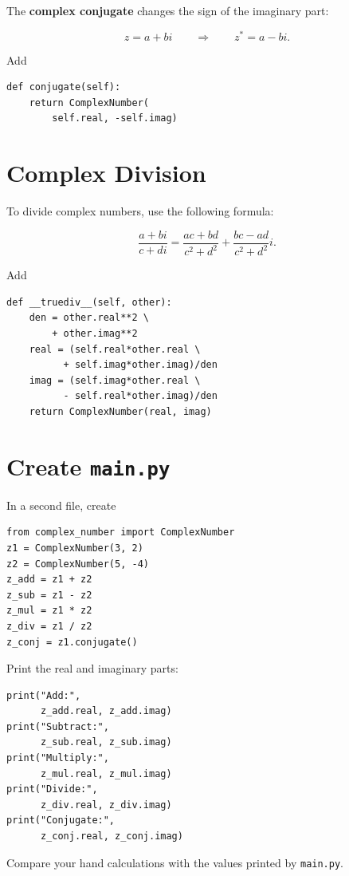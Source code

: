 \documentclass{article}
\begin{document}
The \textbf{complex conjugate} changes the sign of the
imaginary part:

\[
z=a+bi
\qquad\Longrightarrow\qquad
z^*=a-bi.
\]

Add

\begin{verbatim}
def conjugate(self):
    return ComplexNumber(
        self.real, -self.imag)
\end{verbatim}

\section{Complex Division}

To divide complex numbers, use the following formula:

\[
\frac{a+bi}{c+di}
=
\frac{ac+bd}{c^2+d^2}
+
\frac{bc-ad}{c^2+d^2}i.
\]

Add

\begin{verbatim}
def __truediv__(self, other):
    den = other.real**2 \
        + other.imag**2
    real = (self.real*other.real \
          + self.imag*other.imag)/den
    imag = (self.imag*other.real \
          - self.real*other.imag)/den
    return ComplexNumber(real, imag)
\end{verbatim}

\section{Create \texttt{main.py}}

In a second file, create

\begin{verbatim}
from complex_number import ComplexNumber
z1 = ComplexNumber(3, 2)
z2 = ComplexNumber(5, -4)
z_add = z1 + z2
z_sub = z1 - z2
z_mul = z1 * z2
z_div = z1 / z2
z_conj = z1.conjugate()
\end{verbatim}

Print the real and imaginary parts:

\begin{verbatim}
print("Add:",
      z_add.real, z_add.imag)
print("Subtract:",
      z_sub.real, z_sub.imag)
print("Multiply:",
      z_mul.real, z_mul.imag)
print("Divide:",
      z_div.real, z_div.imag)
print("Conjugate:",
      z_conj.real, z_conj.imag)
\end{verbatim}

Compare your hand calculations with the values printed by
\texttt{main.py}.
\end{document}
